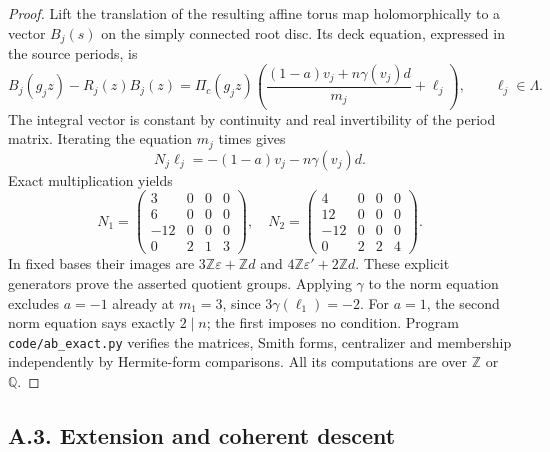 \begin{proof}
Lift the translation of the resulting affine torus map holomorphically to a vector $B_j(s)$ on the simply connected root disc. Its deck equation, expressed in the source periods, is
\[
 B_j(g_jz)-R_j(z)B_j(z)=\Pi_c(g_jz)
 \left(\frac{(1-a)v_j+n\gamma(v_j)d}{m_j}+\ell_j\right),\qquad\ell_j\in\Lambda.
\]
The integral vector is constant by continuity and real invertibility of the period matrix. Iterating the equation $m_j$ times gives
\[
 N_j\ell_j=-(1-a)v_j-n\gamma(v_j)d.
\]
Exact multiplication yields
\[
 N_1=\begin{pmatrix}3&0&0&0\\6&0&0&0\\-12&0&0&0\\0&2&1&3\end{pmatrix},\quad
 N_2=\begin{pmatrix}4&0&0&0\\12&0&0&0\\-12&0&0&0\\0&2&2&4\end{pmatrix}.
\]
In fixed bases their images are $3\mathbb Z\varepsilon+\mathbb Zd$ and $4\mathbb Z\varepsilon'+2\mathbb Zd$. These explicit generators prove the asserted quotient groups. Applying $\gamma$ to the norm equation excludes $a=-1$ already at $m_1=3$, since $3\gamma(\ell_1)=-2$. For $a=1$, the second norm equation says exactly $2\mid n$; the first imposes no condition. Program \texttt{code/ab\_exact.py} verifies the matrices, Smith forms, centralizer and membership independently by Hermite-form comparisons. All its computations are over $\mathbb Z$ or $\mathbb Q$.
\end{proof}

\subsection{A.3. Extension and coherent descent}

